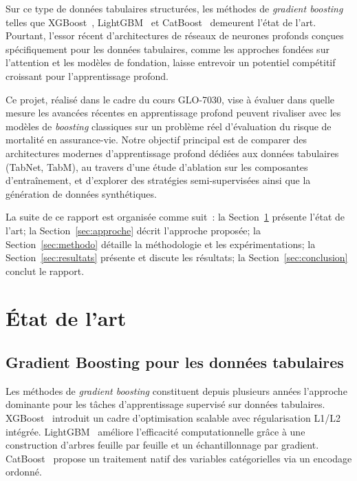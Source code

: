 \documentclass[conference]{IEEEtran}
\begin{document}
Sur ce type de données tabulaires structurées, les méthodes de \textit{gradient boosting} telles que XGBoost~\cite{chen2016xgboost}, LightGBM~\cite{ke2017lightgbm} et CatBoost~\cite{prokhorenkova2018catboost} demeurent l'état de l'art. Pourtant, l'essor récent d'architectures de réseaux de neurones profonds conçues spécifiquement pour les données tabulaires, comme les approches fondées sur l'attention et les modèles de fondation, laisse entrevoir un potentiel compétitif croissant pour l'apprentissage profond.

Ce projet, réalisé dans le cadre du cours GLO-7030, vise à évaluer dans quelle mesure les avancées récentes en apprentissage profond peuvent rivaliser avec les modèles de \textit{boosting} classiques sur un problème réel d'évaluation du risque de mortalité en assurance-vie. Notre objectif principal est de comparer des architectures modernes d'apprentissage profond dédiées aux données tabulaires (TabNet, TabM), au travers d'une étude d'ablation sur les composantes d'entraînement, et d'explorer des stratégies semi-supervisées ainsi que la génération de données synthétiques.

La suite de ce rapport est organisée comme suit~: la Section~\ref{sec:etat_art} présente l'état de l'art; la Section~\ref{sec:approche} décrit l'approche proposée; la Section~\ref{sec:methodo} détaille la méthodologie et les expérimentations; la Section~\ref{sec:resultats} présente et discute les résultats; la Section~\ref{sec:conclusion} conclut le rapport.

\section{État de l'art}
\label{sec:etat_art}

\subsection{Gradient Boosting pour les données tabulaires}

Les méthodes de \textit{gradient boosting} constituent depuis plusieurs années l'approche dominante pour les tâches d'apprentissage supervisé sur données tabulaires. XGBoost~\cite{chen2016xgboost} introduit un cadre d'optimisation scalable avec régularisation L1/L2 intégrée. LightGBM~\cite{ke2017lightgbm} améliore l'efficacité computationnelle grâce à une construction d'arbres feuille par feuille et un échantillonnage par gradient. CatBoost~\cite{prokhorenkova2018catboost} propose un traitement natif des variables catégorielles via un encodage ordonné.
\end{document}
